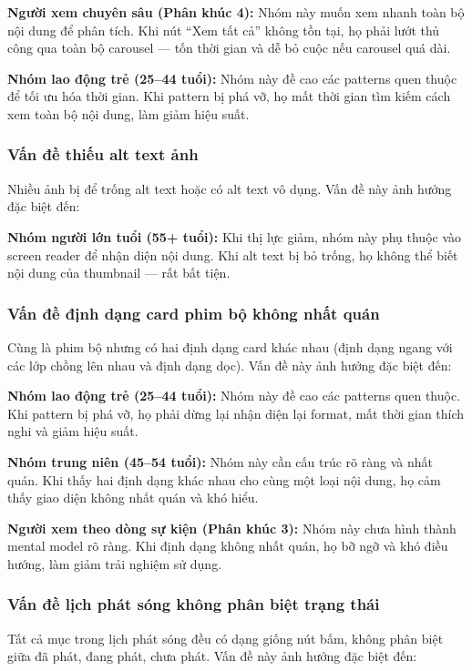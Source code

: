 \textbf{Người xem chuyên sâu (Phân khúc 4):} Nhóm này muốn xem nhanh toàn bộ nội dung để phân tích. Khi nút ``Xem tất cả'' không tồn tại, họ phải lướt thủ công qua toàn bộ carousel --- tốn thời gian và dễ bỏ cuộc nếu carousel quá dài.

\textbf{Nhóm lao động trẻ (25--44 tuổi):} Nhóm này đề cao các patterns quen thuộc để tối ưu hóa thời gian. Khi pattern bị phá vỡ, họ mất thời gian tìm kiếm cách xem toàn bộ nội dung, làm giảm hiệu suất.

\subsubsection{Vấn đề thiếu alt text ảnh}

Nhiều ảnh bị để trống alt text hoặc có alt text vô dụng. Vấn đề này ảnh hưởng đặc biệt đến:

\textbf{Nhóm người lớn tuổi (55+ tuổi):} Khi thị lực giảm, nhóm này phụ thuộc vào screen reader để nhận diện nội dung. Khi alt text bị bỏ trống, họ không thể biết nội dung của thumbnail --- rất bất tiện.

\subsubsection{Vấn đề định dạng card phim bộ không nhất quán}

Cùng là phim bộ nhưng có hai định dạng card khác nhau (định dạng ngang với các lớp chồng lên nhau và định dạng dọc). Vấn đề này ảnh hưởng đặc biệt đến:

\textbf{Nhóm lao động trẻ (25--44 tuổi):} Nhóm này đề cao các patterns quen thuộc. Khi pattern bị phá vỡ, họ phải dừng lại nhận diện lại format, mất thời gian thích nghi và giảm hiệu suất.

\textbf{Nhóm trung niên (45--54 tuổi):} Nhóm này cần cấu trúc rõ ràng và nhất quán. Khi thấy hai định dạng khác nhau cho cùng một loại nội dung, họ cảm thấy giao diện không nhất quán và khó hiểu.

\textbf{Người xem theo dòng sự kiện (Phân khúc 3):} Nhóm này chưa hình thành mental model rõ ràng. Khi định dạng không nhất quán, họ bỡ ngỡ và khó điều hướng, làm giảm trải nghiệm sử dụng.

\subsubsection{Vấn đề lịch phát sóng không phân biệt trạng thái}

Tất cả mục trong lịch phát sóng đều có dạng giống nút bấm, không phân biệt giữa đã phát, đang phát, chưa phát. Vấn đề này ảnh hưởng đặc biệt đến:

